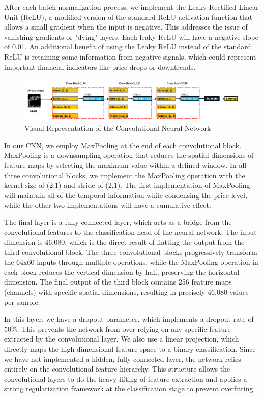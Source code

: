 \documentclass[12pt]{article}
\begin{document}
After each batch normalization process, we implement the Leaky Rectified Linear Unit (ReLU), a modified version of the standard ReLU activation function that allows a small gradient when the input is negative. This addresses the issue of vanishing gradients or "dying" layers. Each leaky ReLU will have a negative slope of 0.01. An additional benefit of using the Leaky ReLU instead of the standard ReLU is retaining some information from negative signals, which could represent important financial indicators like price drops or downtrends.

\begin{figure}[h]
	\centering
	\includegraphics[width=1.05\linewidth]{plots/CNN.png}
	\caption{Visual Representation of the Convolutional Neural Network}
	\label{fig:cnn}
\end{figure}

In our CNN, we employ MaxPooling at the end of each convolutional block. MaxPooling is a downsampling operation that reduces the spatial dimensions of feature maps by selecting the maximum value within a defined window. In all three convolutional blocks, we implement the MaxPooling operation with the kernel size of (2,1) and stride of (2,1). The first implementation of MaxPooling will maintain all of the temporal information while condensing the price level, while the other two implementations will have a cumulative effect.

The final layer is a fully connected layer, which acts as a bridge from the convolutional features to the classification head of the neural network. The input dimension is 46,080, which is the direct result of flatting the output from the third convolutional block. The three convolutional blocks progressively transform the 64x60 inputs through multiple operations, while the MaxPooling operation in each block reduces the vertical dimension by half, preserving the horizontal dimension. The final output of the third block contains 256 feature maps (channels) with specific spatial dimensions, resulting in precisely 46,080 values per sample.

In this layer, we have a dropout parameter, which implements a dropout rate of 50\%. This prevents the network from over-relying on any specific feature extracted by the convolutional layer. We also use a linear projection, which directly maps the high-dimensional feature space to a binary classification. Since we have not implemented a hidden, fully connected layer, the network relies entirely on the convolutional feature hierarchy. This structure allows the convolutional layers to do the heavy lifting of feature extraction and applies a strong regularization framework at the classification stage to prevent overfitting.
\end{document}
